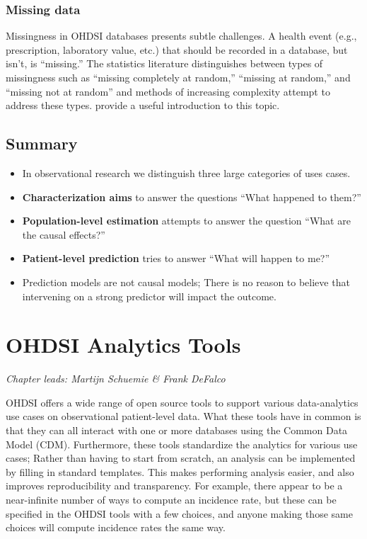 \documentclass[11pt]{book}
\theoremstyle{definition}
\theoremstyle{definition}
\theoremstyle{definition}
\theoremstyle{remark}
\let\BeginKnitrBlock\begin \let\EndKnitrBlock\end
\begin{document}
\hypertarget{missing-data}{%
\subsection{Missing data}\label{missing-data}}

Missingness in OHDSI databases presents subtle challenges. A health event (e.g., prescription, laboratory value, etc.) that should be recorded in a database, but isn't, is ``missing.'' The statistics literature distinguishes between types of missingness such as ``missing completely at random,'' ``missing at random,'' and ``missing not at random'' and methods of increasing complexity attempt to address these types. \citet{perkins2017principled} provide a useful introduction to this topic.

\hypertarget{summary-4}{%
\section{Summary}\label{summary-4}}

\BeginKnitrBlock{rmdsummary}
\begin{itemize}
\item
  In observational research we distinguish three large categories of uses cases.
\item
  \textbf{Characterization aims} to answer the questions ``What happened to them?''
\item
  \textbf{Population-level estimation} attempts to answer the question ``What are the causal effects?''
\item
  \textbf{Patient-level prediction} tries to answer ``What will happen to me?''
\item
  Prediction models are not causal models; There is no reason to believe that intervening on a strong predictor will impact the outcome.
\end{itemize}
\EndKnitrBlock{rmdsummary}

\hypertarget{OhdsiAnalyticsTools}{%
\chapter{OHDSI Analytics Tools}\label{OhdsiAnalyticsTools}}

\emph{Chapter leads: Martijn Schuemie \& Frank DeFalco}

OHDSI offers a wide range of open source tools to support various data-analytics use cases on observational patient-level data. What these tools have in common is that they can all interact with one or more databases using the Common Data Model (CDM). Furthermore, these tools standardize the analytics for various use cases; Rather than having to start from scratch, an analysis can be implemented by filling in standard templates. This makes performing analysis easier, and also improves reproducibility and transparency. For example, there appear to be a near-infinite number of ways to compute an incidence rate, but these can be specified in the OHDSI tools with a few choices, and anyone making those same choices will compute incidence rates the same way.
\end{document}
